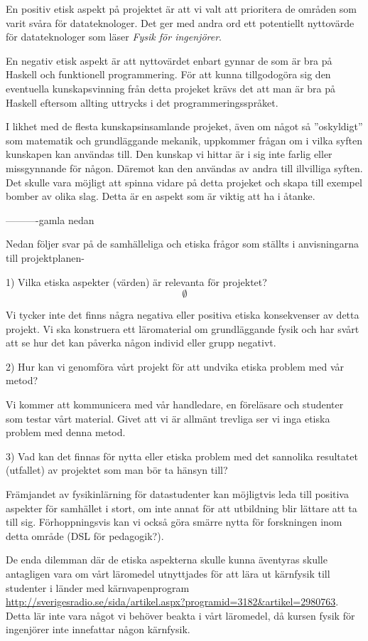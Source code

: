 \documentclass[12pt,a4paper]{article}
\begin{document}
En positiv etisk aspekt på projektet är att vi valt att prioritera de områden som varit svåra för datateknologer. Det ger med andra ord ett potentiellt nyttovärde för datateknologer som läser \textit{Fysik för ingenjörer}.

En negativ etisk aspekt är att nyttovärdet enbart gynnar de som är bra på Haskell och funktionell programmering. För att kunna tillgodogöra sig den eventuella kunskapsvinning från detta projeket krävs det att man är bra på Haskell eftersom allting uttrycks i det programmeringsspråket.

I likhet med de flesta kunskapsinsamlande projeket, även om något så ''oskyldigt'' som matematik och grundläggande mekanik, uppkommer frågan om i vilka syften kunskapen kan användas till. Den kunskap vi hittar är i sig inte farlig eller missgynnande för någon. Däremot kan den användas av andra till illvilliga syften. Det skulle vara möjligt att spinna vidare på detta projeket och skapa till exempel bomber av olika slag. Detta är en aspekt som är viktig att ha i åtanke.




----------gamla nedan

Nedan följer svar på de samhälleliga och etiska frågor som ställts i anvisningarna till projektplanen-

1) Vilka etiska  aspekter (värden) är relevanta för projektet?
\[
\emptyset
\]

Vi tycker inte det finns några negativa eller positiva etiska konsekvenser av detta projekt. Vi ska konstruera ett läromaterial om grundläggande fysik och har svårt att se hur det kan påverka någon individ eller grupp negativt.

2) Hur kan vi genomföra vårt projekt för att undvika etiska problem med vår metod?

Vi kommer att kommunicera med vår handledare, en föreläsare och studenter som testar vårt material. Givet att vi är allmänt trevliga ser vi inga etiska problem med denna metod.

3) Vad kan det finnas för nytta eller etiska problem med det sannolika resultatet (utfallet) av projektet som man bör ta hänsyn till?

Främjandet av fysikinlärning för datastudenter kan möjligtvis leda till positiva aspekter för samhället i stort, om inte annat för att utbildning blir lättare att ta till sig. Förhoppningsvis kan vi också göra smärre nytta för forskningen inom detta område (DSL för pedagogik?).

De enda dilemman där de etiska aspekterna skulle kunna äventyras skulle antagligen vara om vårt läromedel utnyttjades för att lära ut kärnfysik till studenter i länder med kärnvapenprogram \url{http://sverigesradio.se/sida/artikel.aspx?programid=3182&artikel=2980763}.
   Detta lär inte vara något vi behöver beakta i vårt läromedel, då kursen fysik för ingenjörer inte innefattar någon kärnfysik.
\end{document}
